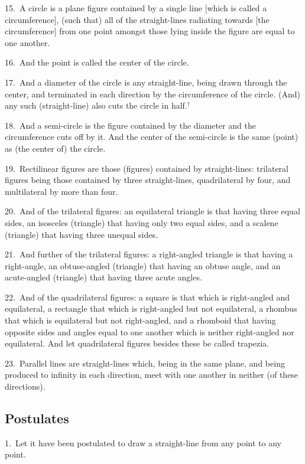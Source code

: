 \documentclass{ximera}
\begin{document}
{15.~A circle is a plane figure  contained by a single line [which is called a circumference], (such that) all of the straight-lines  radiating towards
 [the circumference] from one
point amongst those lying inside the figure  are equal to one another.

16.~And the point is called the center of the circle.

17.~And a diameter of the circle is any straight-line, being drawn through the
center, and terminated in each direction by the circumference of the circle. (And) any such (straight-line) also cuts the circle in half.$^\dag$

18.~And a semi-circle is the figure contained by the diameter  and
the circumference  cuts off by it. And the center of the semi-circle is the same (point)
as (the center of) the circle.

19.~Rectilinear figures are those (figures) contained by straight-lines: trilateral
figures being those contained by three straight-lines,  quadrilateral   by four,
and multilateral by more than four.

20.~And of the trilateral figures: an equilateral triangle is that having
three equal sides, an isosceles (triangle) that having only two equal sides,
and a scalene (triangle) that having three unequal sides.

21.~And further of the trilateral figures: a right-angled triangle is that having
a right-angle, an obtuse-angled  (triangle) that having an obtuse
angle, and an acute-angled (triangle) that having three acute angles.

22.~And of the quadrilateral figures: a square is that which is right-angled
and equilateral, a rectangle that which is right-angled but not equilateral,
a rhombus that which is equilateral but not right-angled, and a rhomboid that
having opposite sides and angles equal to one another which is neither
right-angled nor equilateral. And let quadrilateral figures besides these be called
trapezia.

23.~Parallel lines are straight-lines which, being in the same plane, and
being produced to infinity in each direction, meet with one another in
neither (of these directions).

\subsection*{Postulates}

1.~Let it have been postulated to draw a straight-line from any point to any point.

}
\end{document}
